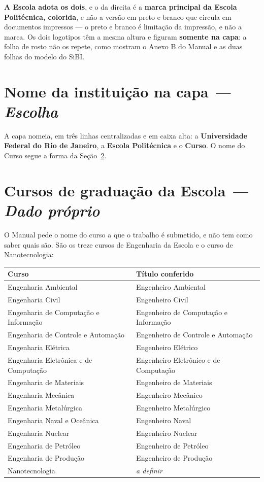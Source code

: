 \documentclass[a4paper,11pt]{article}
\newcommand\tipo[1]{\normalfont\textit{--- #1}}
\begin{document}
\textbf{A Escola adota os dois}, e o da direita é a \textbf{marca principal da
Escola Politécnica, colorida}, e não a versão em preto e branco que circula em
documentos impressos --- o preto e branco é limitação da impressão, e não a
marca. Os dois logotipos têm a mesma altura e figuram \textbf{somente na capa}:
a folha de rosto não os repete, como mostram o Anexo B do Manual e as duas
folhas do modelo do SiBI.

\section{Nome da instituição na capa \tipo{Escolha}}

A capa nomeia, em três linhas centralizadas e em caixa alta: a
\textbf{Universidade Federal do Rio de Janeiro}, a \textbf{Escola Politécnica} e
o \textbf{Curso}. O nome do Curso segue a forma da Seção~\ref{norma:cursos}.

\section{Cursos de graduação da Escola \tipo{Dado próprio}}
\label{norma:cursos}

O Manual pede o nome do curso a que o trabalho é submetido, e não tem como
saber quais são. São os treze cursos de Engenharia da Escola e o curso de
Nanotecnologia:

\begin{center}
\begin{tabular}{@{}ll@{}}
\toprule
\textbf{Curso} & \textbf{Título conferido} \\
\midrule
Engenharia Ambiental & Engenheiro Ambiental\\
Engenharia Civil & Engenheiro Civil\\
Engenharia de Computação e Informação & Engenheiro de Computação e Informação\\
Engenharia de Controle e Automação & Engenheiro de Controle e Automação\\
Engenharia Elétrica & Engenheiro Elétrico\\
Engenharia Eletrônica e de Computação & Engenheiro Eletrônico e de Computação\\
Engenharia de Materiais & Engenheiro de Materiais\\
Engenharia Mecânica & Engenheiro Mecânico\\
Engenharia Metalúrgica & Engenheiro Metalúrgico\\
Engenharia Naval e Oceânica & Engenheiro Naval\\
Engenharia Nuclear & Engenheiro Nuclear\\
Engenharia de Petróleo & Engenheiro de Petróleo\\
Engenharia de Produção & Engenheiro de Produção\\
Nanotecnologia & \textit{a definir}\\
\bottomrule
\end{tabular}
\end{center}
\end{document}
